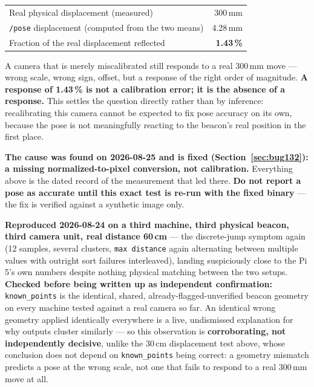 \documentclass[11pt]{report}
\begin{document}
\begin{center}
\begin{tabular}{@{}lr@{}}
\toprule
Real physical displacement (measured) & 300\,mm \\
\texttt{/pose} displacement (computed from the two means) & 4.28\,mm \\
Fraction of the real displacement reflected & \textbf{1.43\,\%} \\
\bottomrule
\end{tabular}
\end{center}

A camera that is merely miscalibrated still responds to a real 300\,mm move
--- wrong scale, wrong sign, offset, but a response of the right order of
magnitude. \textbf{A response of 1.43\,\% is not a calibration error; it is
the absence of a response.} This settles the question directly rather than
by inference: recalibrating this camera cannot be expected to fix pose
accuracy on its own, because the pose is not meaningfully reacting to the
beacon's real position in the first place.

\textbf{The cause was found on 2026-08-25 and is fixed
(Section~\ref{sec:bug132}): a missing normalized-to-pixel conversion, not
calibration.} Everything above is the dated record of the measurement that
led there. \textbf{Do not report a pose as accurate until this exact test is
re-run with the fixed binary} --- the fix is verified against a synthetic
image only.

\textbf{Reproduced 2026-08-24 on a third machine, third physical beacon,
third camera unit, real distance 60\,cm} --- the discrete-jump symptom
again (12 samples, several clusters, \texttt{max distance} again
alternating between multiple values with outright sort failures
interleaved), landing suspiciously close to the Pi 5's own numbers despite
nothing physical matching between the two setups. \textbf{Checked before
being written up as independent confirmation:} \texttt{known\_points} is
the identical, shared, already-flagged-unverified beacon geometry on every
machine tested against a real camera so far. An identical wrong geometry
applied identically everywhere is a live, undismissed explanation for why
outputs cluster similarly --- so this observation is
\textbf{corroborating, not independently decisive}, unlike the 30\,cm
displacement test above, whose conclusion does not depend on
\texttt{known\_points} being correct: a geometry mismatch predicts a pose
at the wrong scale, not one that fails to respond to a real 300\,mm move
at all.
\end{document}
